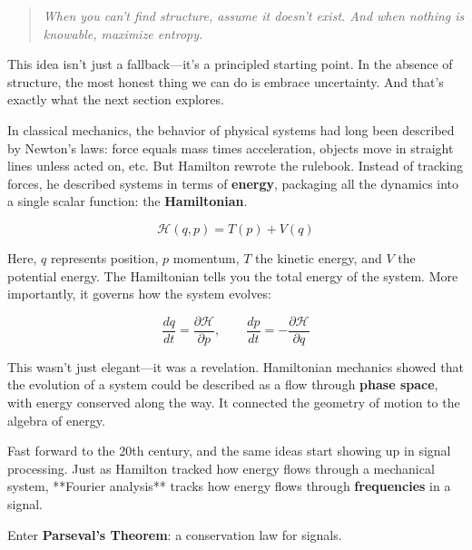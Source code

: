 \begin{quote}
\textit{When you can’t find structure, assume it doesn’t exist. And when nothing is knowable, maximize entropy.}
\end{quote}

This idea isn’t just a fallback—it’s a principled starting point. In the absence of structure, the most honest thing we can do is embrace uncertainty. And that’s exactly what the next section explores.




\begin{tcolorbox}[colback=gray!5!white, colframe=black!80!white, title={Historical Sidebar: From Hamiltonian Mechanics to Energy Spectra}]

  In classical mechanics, the behavior of physical systems had long been described by Newton’s laws: force equals mass times acceleration, objects move in straight lines unless acted on, etc. But Hamilton rewrote the rulebook. Instead of tracking forces, he described systems in terms of \textbf{energy}, packaging all the dynamics into a single scalar function: the \textbf{Hamiltonian}.
  
  \medskip
  
  \[
  \mathcal{H}(q, p) = T(p) + V(q)
  \]
  
  Here, \( q \) represents position, \( p \) momentum, \( T \) the kinetic energy, and \( V \) the potential energy. The Hamiltonian tells you the total energy of the system. More importantly, it governs how the system evolves:
  
  \[
  \frac{dq}{dt} = \frac{\partial \mathcal{H}}{\partial p}, \qquad \frac{dp}{dt} = -\frac{\partial \mathcal{H}}{\partial q}
  \]
  
  \medskip
  
  This wasn’t just elegant—it was a revelation. Hamiltonian mechanics showed that the evolution of a system could be described as a flow through \textbf{phase space}, with energy conserved along the way. It connected the geometry of motion to the algebra of energy.
  
  \bigskip
  
  Fast forward to the 20th century, and the same ideas start showing up in signal processing. Just as Hamilton tracked how energy flows through a mechanical system, **Fourier analysis** tracks how energy flows through \textbf{frequencies} in a signal. 
  
  \medskip
  
  Enter \textbf{Parseval’s Theorem}: a conservation law for signals.
  

\end{tcolorbox}
